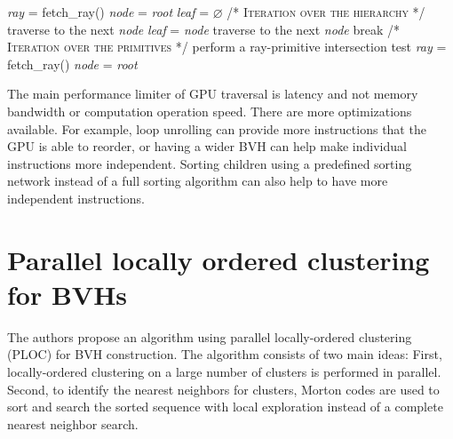 \begin{algorithm}[h!tb]
\caption{Persistent speculative while-while traversal algorithm. Speculative traversal of inner nodes is marked in blue and ray fetching for persistent threads in green.\cite{Meister2021}}
\label{alg:while-while}
\begin{algorithmic}[1]
\State \textit{ray} = fetch\_ray()
\State \textit{node} = \textit{root}
{\color{blue}\State \textit{leaf} = $\varnothing$}
    \State /* \textsc{Iteration over the hierarchy} */
        \State traverse to the next \textit{node}
        \color{blue}
            \State \textit{leaf} = \textit{node}
            \State traverse to the next \textit{node}
        \EndIf
            \State break
        \EndIf
        \color{black}
    \EndWhile
    \State /* \textsc{Iteration over the primitives} */
        \State perform a ray-primitive intersection test
        \color{darkgreen}
            \State \textit{ray} = fetch\_ray()
            \State \textit{node} = \textit{root}
        \color{black}
        \EndIf
    \EndWhile
\EndWhile
\end{algorithmic}
\end{algorithm}

The main performance limiter of GPU traversal is latency \cite{Guthe14} and not memory bandwidth or computation operation speed. There are more optimizations available. For example, loop unrolling can provide more instructions that the GPU is able to reorder, or having a wider BVH can help make individual instructions more independent. Sorting children using a predefined sorting network instead of a full sorting algorithm can also help to have more independent instructions. \cite{Meister2021}


\clearpage
\section{Parallel locally ordered clustering for BVHs}

The authors \cite{MB17} propose an algorithm using parallel locally-ordered clustering (PLOC) for BVH construction. The algorithm consists of two main ideas: First, locally-ordered clustering on a large number of clusters is performed in parallel. Second, to identify the nearest neighbors for clusters, Morton codes are used to sort and search the sorted sequence with local exploration instead of a complete nearest neighbor search.

